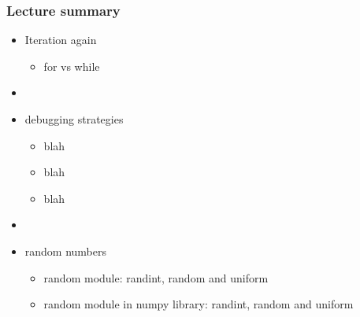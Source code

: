 \documentclass[14pt]{beamer}
\begin{document}
\begin{frame}[fragile]

\frametitle{Lecture summary}
\begin{itemize}
	\item Iteration again
	\begin{itemize}
		\item for vs while
	\end{itemize}

	\item[]
	
	\item debugging strategies
		\begin{itemize}
			\item blah
			\item blah
			\item blah
		\end{itemize}

	\item[]
	
	\item random numbers
		\begin{itemize}
			\item random module: randint, random and uniform
			\item random module in numpy library: randint, random and uniform
		\end{itemize}
		
\end{itemize}

\end{frame}
\end{document}
